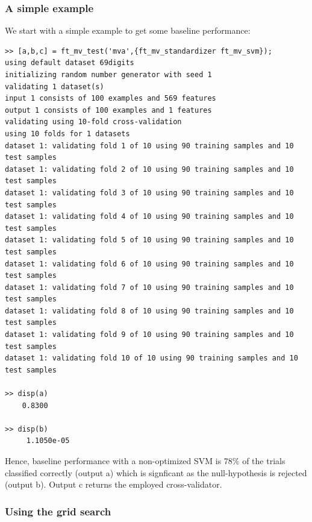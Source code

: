 \documentclass{article}
\begin{document}
\subsubsection*{A simple example}
We start with a simple example to get some baseline performance:
\begin{verbatim}
>> [a,b,c] = ft_mv_test('mva',{ft_mv_standardizer ft_mv_svm});
using default dataset 69digits
initializing random number generator with seed 1
validating 1 dataset(s)
input 1 consists of 100 examples and 569 features
output 1 consists of 100 examples and 1 features
validating using 10-fold cross-validation
using 10 folds for 1 datasets
dataset 1: validating fold 1 of 10 using 90 training samples and 10 test samples
dataset 1: validating fold 2 of 10 using 90 training samples and 10 test samples
dataset 1: validating fold 3 of 10 using 90 training samples and 10 test samples
dataset 1: validating fold 4 of 10 using 90 training samples and 10 test samples
dataset 1: validating fold 5 of 10 using 90 training samples and 10 test samples
dataset 1: validating fold 6 of 10 using 90 training samples and 10 test samples
dataset 1: validating fold 7 of 10 using 90 training samples and 10 test samples
dataset 1: validating fold 8 of 10 using 90 training samples and 10 test samples
dataset 1: validating fold 9 of 10 using 90 training samples and 10 test samples
dataset 1: validating fold 10 of 10 using 90 training samples and 10 test samples

>> disp(a)
    0.8300

>> disp(b)
     1.1050e-05

\end{verbatim}
Hence, baseline performance with a non-optimized SVM is 78\% of the trials classified correctly (output a) which is signficant as the null-hypothesis is rejected (output b). Output c returns the employed cross-validator.

\subsubsection*{Using the grid search}
\end{document}

